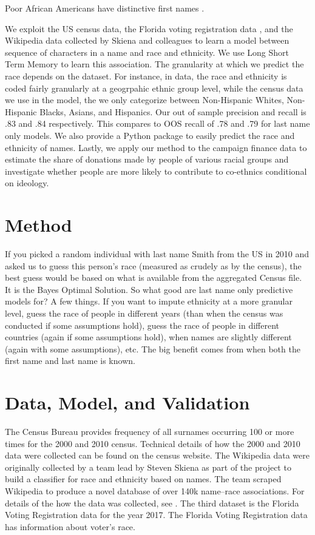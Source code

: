 \documentclass[12pt, letterpaper]{article}
\begin{document}
Poor African Americans have distinctive first names \citep{bertrand2004emily}.

We exploit the US census data, the Florida voting registration data \citep{UBIG3F_2017}, and the Wikipedia data collected by Skiena and colleagues \citep{ambekar2009name} to learn a model between sequence of characters in a name and race and ethnicity. We use Long Short Term Memory to learn this association. The granularity at which we predict the race depends on the dataset. For instance, in \citet{ambekar2009name} data, the race and ethnicity is coded fairly granularly at a geogrpahic ethnic group level, while the census data we use in the model, the we only categorize between Non-Hispanic Whites, Non-Hispanic Blacks, Asians, and Hispanics. Our out of sample precision and recall is .83 and .84 respectively. This compares to OOS recall of .78 and .79 for last name only models. We also provide a Python package to easily predict the race and ethnicity of names. Lastly, we apply our method to the campaign finance data to estimate the share of donations made by people of various racial groups and investigate whether people are more likely to contribute to co-ethnics conditional on ideology.

\section*{Method}
If you picked a random individual with last name Smith from the US in 2010 and asked us to guess this person's race (measured as crudely as by the census), the best guess would be based on what is available from the aggregated Census file. It is the Bayes Optimal Solution. So what good are last name only predictive models for? A few things. If you want to impute ethnicity at a more granular level, guess the race of people in different years (than when the census was conducted if some assumptions hold), guess the race of people in different countries (again if some assumptions hold), when names are slightly different (again with some assumptions), etc. The big benefit comes from when both the first name and last name is known.

\section*{Data, Model, and Validation}
The Census Bureau provides frequency of all surnames occurring 100 or more times for the 2000 and 2010 census. Technical details of how the 2000 and 2010 data were collected can be found on the census website. 
The Wikipedia data were originally collected by a team lead by Steven Skiena as part of the project to build a classifier for race and ethnicity based on names. The team scraped Wikipedia to produce a novel database of over 140k name--race associations. For details of the how the data was collected, see \citet{ambekar2009name}. The third dataset is the Florida Voting Registration data for the year 2017. The Florida Voting Registration data has information about voter's race. 
\end{document}
